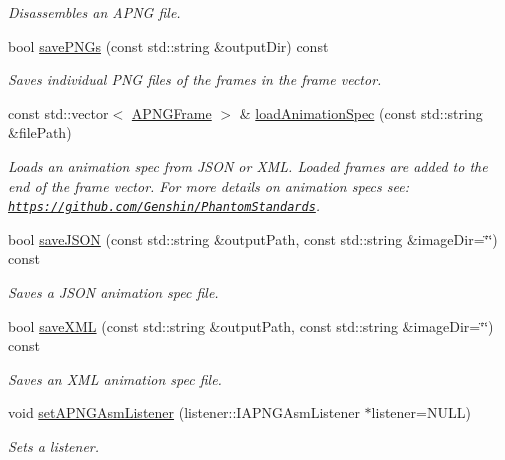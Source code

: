 \begin{DoxyCompactItemize}
\begin{DoxyCompactList}\small\item\em Disassembles an A\-P\-N\-G file. \end{DoxyCompactList}\item 
bool \hyperlink{classapngasm_1_1APNGAsm_a59ebac9f6db6973bc8e5b5d05e72586f}{save\-P\-N\-Gs} (const std\-::string \&output\-Dir) const 
\begin{DoxyCompactList}\small\item\em Saves individual P\-N\-G files of the frames in the frame vector. \end{DoxyCompactList}\item 
const std\-::vector$<$ \hyperlink{classapngasm_1_1APNGFrame}{A\-P\-N\-G\-Frame} $>$ \& \hyperlink{classapngasm_1_1APNGAsm_acf09916f78025c714a205142cdae1349}{load\-Animation\-Spec} (const std\-::string \&file\-Path)
\begin{DoxyCompactList}\small\item\em Loads an animation spec from J\-S\-O\-N or X\-M\-L. Loaded frames are added to the end of the frame vector. For more details on animation specs see\-: \href{https://github.com/Genshin/PhantomStandards}{\tt https\-://github.\-com/\-Genshin/\-Phantom\-Standards}. \end{DoxyCompactList}\item 
bool \hyperlink{classapngasm_1_1APNGAsm_abdb6681c9013cf41a026a4dd48331557}{save\-J\-S\-O\-N} (const std\-::string \&output\-Path, const std\-::string \&image\-Dir=\char`\"{}\char`\"{}) const 
\begin{DoxyCompactList}\small\item\em Saves a J\-S\-O\-N animation spec file. \end{DoxyCompactList}\item 
bool \hyperlink{classapngasm_1_1APNGAsm_a978d3036659830a811e6b6572c84ee10}{save\-X\-M\-L} (const std\-::string \&output\-Path, const std\-::string \&image\-Dir=\char`\"{}\char`\"{}) const 
\begin{DoxyCompactList}\small\item\em Saves an X\-M\-L animation spec file. \end{DoxyCompactList}\item 
void \hyperlink{classapngasm_1_1APNGAsm_ad05b4e47d6b089cdd209cae94adb4c30}{set\-A\-P\-N\-G\-Asm\-Listener} (listener\-::\-I\-A\-P\-N\-G\-Asm\-Listener $\ast$listener=N\-U\-L\-L)
\begin{DoxyCompactList}\small\item\em Sets a listener. \end{DoxyCompactList}\item 

\end{DoxyCompactItemize}
